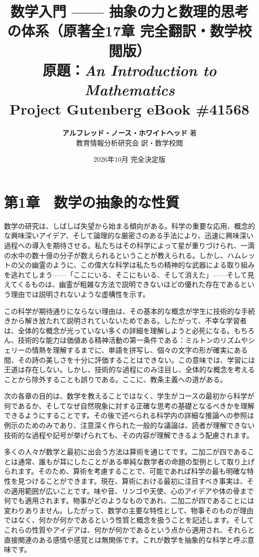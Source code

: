 \documentclass[a4paper,11pt,openany]{ltjsbook}
\title{
    {\huge\bfseries\gtfamily 数学入門 —— 抽象の力と数理的思考の体系（原著全17章 完全翻訳・数学校閲版）}\\[14pt]
    {\large 原題：\textit{An Introduction to Mathematics}}\\[6pt]
    {\normalsize Project Gutenberg eBook \#41568}
}
\author{\textbf{アルフレッド・ノース・ホワイトヘッド} 著\\[4pt]教育情報分析研究会 訳・数学校閲}
\date{2026年10月 完全決定版}
\begin{document}
\maketitle
\frontmatter
\tableofcontents
\clearpage
\mainmatter

\chapter{第1章　数学の抽象的な性質}

数学の研究は、しばしば失望から始まる傾向がある。科学の重要な応用、概念的な興味深いアイデア、そして論理的な厳密さのある手法により、迅速に興味深い過程への導入を期待させる。私たちはその科学によって星が重りづけられ、一滴の水中の数十億の分子が数えられるということが教えられる。しかし、ハムレットの父の幽霊のように、この偉大な科学は私たちの精神的な武器による取り組みを逃れてしまう——「ここにいる、そこにもいる、そして消えた」——そして見えてくるものは、幽霊が粗雑な方法で説明できないほどの優れた存在であるという理由では説明されないような虚構性を示す。

この科学が期待通りにならない理由は、その基本的な概念が学生に技術的な手続きから解き放たれて説明されていないためである。したがって、不幸な学習者は、全体的な概念が光っていない多くの詳細を理解しようと必死になる。もちろん、技術的な能力は価値ある精神活動の第一条件である：ミルトンのリズムやシェリーの情熱を理解するまでに、単語を拼写し、個々の文字の形が確実にある間、その詩の美しさを十分に評価することはできない。この意味では、学習には王道は存在しない。しかし、技術的な過程にのみ注目し、全体的な概念を考えることから除外することも誤りである。ここに、教条主義への道がある。

次の各章の目的は、数学を教えることではなく、学生がコースの最初から科学が何であるか、そしてなぜ自然現象に対する正確な思考の基礎となるべきかを理解できるようにすることです。その後で述べられる科学内の詳細な推論への参照は例示のためのみであり、注意深く作られた一般的な議論は、読者が理解できない技術的な過程や記号が挙げられても、その内容が理解できるよう配慮されます。

多くの人々が数学と最初に出会う方法は算術を通じてです。二加二が四であることは通常、誰もが耳にしたことがある単純な数学者の命題の型例として取り上げられます。そのため、算術を考慮することで、可能であれば科学の最も明確な特性を見つけることができます。現在、算術における最初に注目すべき事実は、その適用範囲が広いことです。味や音、リンゴや天使、心のアイデアや体の骨まで何でも適用されます。物事がどのようなものであれ、二加二が四であることには変わりありません。したがって、数学の主要な特性として、物事そのものが理由ではなく、何かが何かであるという性質と概念を扱うことを記述します。そしてこれらの性質やアイデアは、何かが何かであるという点から適用され、それらと直接関連のある感情や感覚とは無関係です。これが数学を抽象的な科学と呼ぶ意味です。
\end{document}
